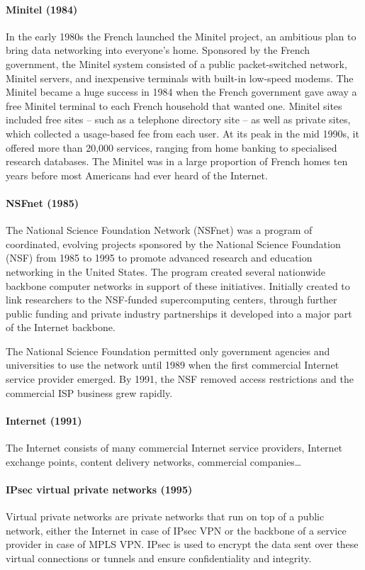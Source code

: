 {\paragraph{Minitel (1984)}
In the early 1980s the French launched the Minitel project, an ambitious plan to bring data networking into everyone’s home.
Sponsored by the French government, the Minitel system consisted of a public packet-switched network, Minitel servers, and inexpensive terminals with built-in low-speed modems.
The Minitel became a huge success in 1984 when the French government gave away a free Minitel terminal to each French household that wanted one.
Minitel sites included free sites -- such as a telephone directory site -- as well as private sites, which collected a usage-based fee from each user.
At its peak in the mid 1990s, it offered more than 20,000 services, ranging from home banking to specialised research databases.
The Minitel was in a large proportion of French homes ten years before most Americans had ever heard of the Internet.

\paragraph{NSFnet (1985)}
The National Science Foundation Network (NSFnet) was a program of coordinated, evolving projects sponsored by the National Science Foundation (NSF) from 1985 to 1995 to promote advanced research and education networking in the United States.
The program created several nationwide backbone computer networks in support of these initiatives.
Initially created to link researchers to the NSF-funded supercomputing centers, through further public funding and private industry partnerships it developed into a major part of the Internet backbone.

The National Science Foundation permitted only government agencies and universities to use the network until 1989 when the first commercial Internet service provider emerged.
By 1991, the NSF removed access restrictions and the commercial ISP business grew rapidly.

\paragraph{Internet (1991)}
The Internet consists of many commercial Internet service providers, Internet exchange points, content delivery networks, commercial companies\ldots

\paragraph{IPsec virtual private networks (1995)}
Virtual private networks are private networks that run on top of a public network, either the Internet in case of IPsec VPN or the backbone of a service provider in case of MPLS VPN.
IPsec is used to encrypt the data sent over these virtual connections or tunnels and ensure confidentiality and integrity.

}

